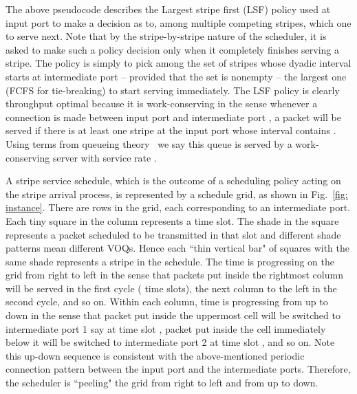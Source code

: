 The above pseudocode describes the Largest stripe first (LSF) policy used at input port  to make
a decision as to, among multiple competing stripes, which one to serve next.   
Note that by the stripe-by-stripe nature of the scheduler, it is asked to make such a policy decision only 
when it completely finishes serving a stripe.
The policy is simply to pick among the set of stripes
whose dyadic
interval starts at intermediate port  -- provided that the set is nonempty --  the largest one (FCFS for tie-breaking) to start serving immediately.  
The LSF policy is clearly throughput optimal because it is work-conserving in the sense whenever a connection is made between input port  and intermediate port , a packet will be served
if there is at least one stripe at the input port 
whose interval contains .  
Using terms from queueing theory~\cite{kleinrock1975queueing}
we say this queue is served by a work-conserving server with service rate .


























A stripe service schedule, which is the outcome of a scheduling policy acting on the stripe arrival process, 
is represented by a schedule grid, as shown in Fig.~\ref{fig: instance}.
There are  rows in the grid, each corresponding
to an intermediate port.  Each tiny square in the column represents a time slot. 
The shade in the square represents a packet scheduled to be transmitted in that slot and
different shade patterns mean different VOQs.  Hence each ``thin vertical bar" of squares with the same shade 
represents a stripe in the schedule.
The time is progressing
on the grid from right to left in the sense that packets put inside the rightmost column 
will be served in the first cycle ( time slots), the next column to the left in the second
cycle, and so on.  Within each column, time is progressing from up to down in the sense
that packet put inside the uppermost cell will be switched to intermediate port 1 say at
time slot , packet put inside the cell immediately below it will be switched to intermediate
port 2 at time slot , and so on.  Note this up-down sequence is consistent with the above-mentioned
periodic connection pattern between the input port and the intermediate ports.
Therefore, the scheduler is ``peeling" the grid from right to left and from up to down.

